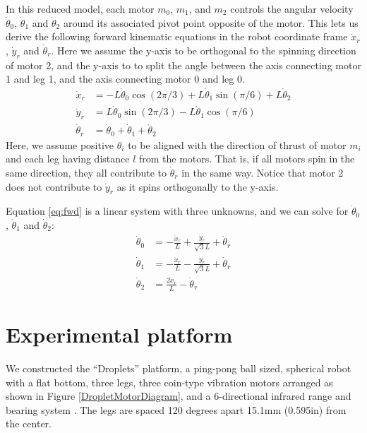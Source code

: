 \documentclass[letterpaper, 10pt, conference]{ieeeconf}
\begin{document}
In this reduced model, each motor $m_0$, $m_1$, and $m_2$ controls the angular velocity $\dot{\theta}_0$, $\dot{\theta}_1$ and $\dot{\theta}_2$ around its associated pivot point opposite of the motor. This lets us derive the following forward kinematic equations in the robot coordinate frame $\dot{x}_r$, $\dot{y}_r$ and $\dot{\theta}_r$.
Here we assume the y-axis to be orthogonal to the spinning direction of motor 2, and the y-axis to to split the angle between the axis connecting motor 1 and leg 1, and the axis connecting motor 0 and leg 0.
\begin{align}\label{eq:fwd}
\dot{x}_r & = -L \dot{\theta}_0 \cos(2 \pi / 3) + L \dot{\theta}_1 \sin(\pi / 6) + L \dot{\theta}_2\\
\nonumber
\dot{y}_r & =  L \dot{\theta}_0 \sin(2 \pi / 3) - L \dot{\theta}_1 \cos(\pi / 6)\\
\nonumber
\dot{\theta}_r & = \dot{\theta}_0 + \dot{\theta}_1 + \dot{\theta}_2
\end{align}
Here, we assume positive $\theta_i$ to be aligned with the direction of thrust of motor $m_i$ and each leg having distance $l$ from the motors. That is, if all motors spin in the same direction, they all contribute to $\dot{\theta}_r$ in the same way. Notice that motor 2 does not contribute to $\dot{y}_r$ as it spins orthogonally to the y-axis.

Equation \ref{eq:fwd} is a linear system with three unknowns, and we can solve for $\dot{\theta}_0$, $\dot{\theta}_1$ and $\dot{\theta}_2$:
\begin{align}\label{eq:ik}
\dot{\theta}_0 & = -\frac{\dot{x}_r}{L} + \frac{\dot{y}_r}{\sqrt{3}L} + \dot{\theta}_r\\
\nonumber
\dot{\theta}_1 & = -\frac{\dot{x}_r}{L} - \frac{\dot{y}_r}{\sqrt{3}L} + \dot{\theta}_r\\
\nonumber
\dot{\theta}_2 & = \frac{2 \dot{x}_r}{L} - \dot{\theta}_r
\end{align}

\section{Experimental platform}
We constructed the ``Droplets'' platform, a ping-pong ball sized, spherical robot with a flat bottom, three legs, three coin-type vibration motors arranged as shown in Figure \ref{DropletMotorDiagram}, and a 6-directional infrared range and bearing system \cite{farrow14}. The legs are spaced 120 degrees apart 15.1mm (0.595in) from the center.
\end{document}
